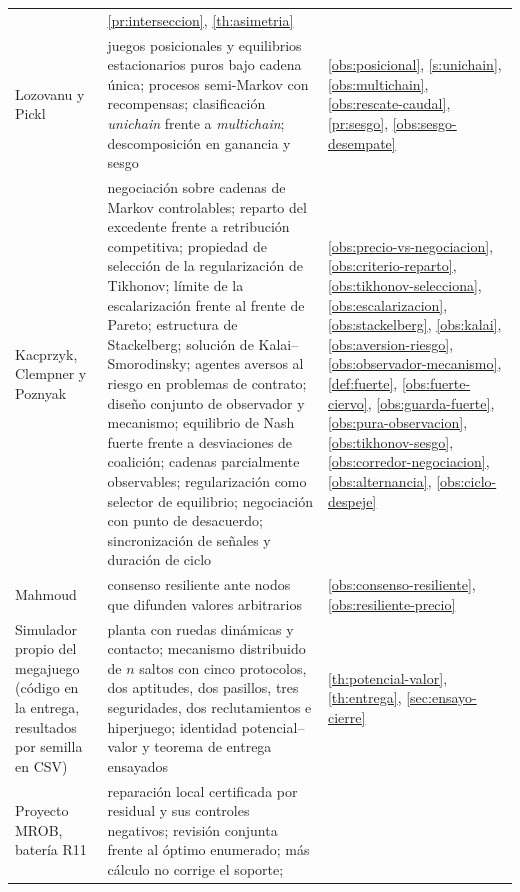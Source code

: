 \begin{table}[!ht]
\begin{tabularx}{\textwidth}{@{}p{4.6cm}p{3.5cm}X@{}}
  & \cref{pr:interseccion}, \cref{th:asimetria} \\
Lozovanu y Pickl \cite{lozovanu2024positional}
  & juegos posicionales y equilibrios estacionarios puros bajo cadena única;
    procesos semi-Markov con recompensas; clasificación \emph{unichain} frente a
    \emph{multichain}; descomposición en ganancia y sesgo
  & \cref{obs:posicional}, \cref{s:unichain}, \cref{obs:multichain},
    \cref{obs:rescate-caudal}, \cref{pr:sesgo}, \cref{obs:sesgo-desempate} \\
Kacprzyk, Clempner y Poznyak \cite{clempner2024optimization}
  & negociación sobre cadenas de Markov controlables; reparto del excedente
    frente a retribución competitiva; propiedad de selección de la
    regularización de Tikhonov; límite de la escalarización frente al frente
    de Pareto; estructura de Stackelberg; solución de Kalai--Smorodinsky;
    agentes aversos al riesgo en problemas de contrato; diseño conjunto de
    observador y mecanismo; equilibrio de Nash fuerte frente a desviaciones de
    coalición; cadenas parcialmente observables; regularización como selector de
    equilibrio; negociación con punto de desacuerdo; sincronización de señales y
    duración de ciclo
  & \cref{obs:precio-vs-negociacion}, \cref{obs:criterio-reparto},
    \cref{obs:tikhonov-selecciona}, \cref{obs:escalarizacion},
    \cref{obs:stackelberg}, \cref{obs:kalai},
    \cref{obs:aversion-riesgo}, \cref{obs:observador-mecanismo},
    \cref{def:fuerte}, \cref{obs:fuerte-ciervo},
    \cref{obs:guarda-fuerte}, \cref{obs:pura-observacion},
    \cref{obs:tikhonov-sesgo}, \cref{obs:corredor-negociacion},
    \cref{obs:alternancia}, \cref{obs:ciclo-despeje} \\
Mahmoud \cite{mahmoud2021advanced}
  & consenso resiliente ante nodos que difunden valores arbitrarios
  & \cref{obs:consenso-resiliente}, \cref{obs:resiliente-precio} \\
Simulador propio del megajuego (código en la entrega, resultados por semilla en CSV)
  & planta con ruedas dinámicas y contacto; mecanismo distribuido de $n$ saltos con
    cinco protocolos, dos aptitudes, dos pasillos, tres seguridades, dos reclutamientos
    e hiperjuego; identidad potencial--valor y teorema de entrega ensayados
  & \cref{th:potencial-valor}, \cref{th:entrega}, \cref{sec:ensayo-cierre} \\
Proyecto MROB, batería R11 \cite{mrob2026r11}
  & reparación local certificada por residual y sus controles negativos; revisión
    conjunta frente al óptimo enumerado; más cálculo no corrige el soporte;

\end{tabularx}
\end{table}
